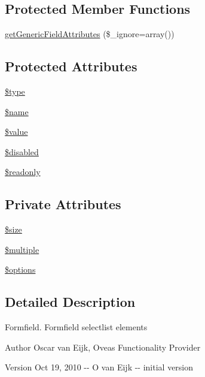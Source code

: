 \subsection*{Protected Member Functions}
\begin{DoxyCompactItemize}
\item 
\hyperlink{classFormField_a9f9d136ba8b4a793f22370aff43d592d}{getGenericFieldAttributes} (\$\_\-ignore=array())
\end{DoxyCompactItemize}
\subsection*{Protected Attributes}
\begin{DoxyCompactItemize}
\item 
\hyperlink{classFormField_a37bed21a1891e95be0e4a697e45ba51b}{\$type}
\item 
\hyperlink{classFormField_a23861f707bcd77bbace6300de9621746}{\$name}
\item 
\hyperlink{classFormField_a3c01e89834248eec8e2f145fbcfa0fbc}{\$value}
\item 
\hyperlink{classFormField_ab6f1907061890290e32cb2befc0a5f50}{\$disabled}
\item 
\hyperlink{classFormField_a78ba5d4b9127e75e8ccf86f397b5d9ac}{\$readonly}
\end{DoxyCompactItemize}
\subsection*{Private Attributes}
\begin{DoxyCompactItemize}
\item 
\hyperlink{classFormFieldSelect_a8e79d63b2f69dc06959f3f0dc6f0a12a}{\$size}
\item 
\hyperlink{classFormFieldSelect_a6eb8f177d1cfd20845509c0a35120725}{\$multiple}
\item 
\hyperlink{classFormFieldSelect_a5c4b74ae8d7274e642e78e5a514c9736}{\$options}
\end{DoxyCompactItemize}


\subsection{Detailed Description}
Formfield. Formfield selectlist elements \begin{DoxyAuthor}{Author}
Oscar van Eijk, Oveas Functionality Provider 
\end{DoxyAuthor}
\begin{DoxyVersion}{Version}
Oct 19, 2010 -\/-\/ O van Eijk -\/-\/ initial version 
\end{DoxyVersion}


